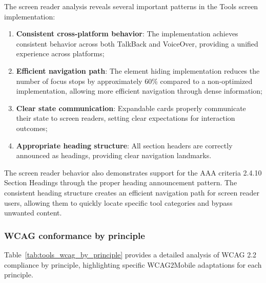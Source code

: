 The screen reader analysis reveals several important patterns in the Tools screen implementation:

\begin{enumerate}
    \item \textbf{Consistent cross-platform behavior}: The implementation achieves consistent behavior across both TalkBack and VoiceOver, providing a unified experience across platforms;
    
    \item \textbf{Efficient navigation path}: The element hiding implementation reduces the number of focus stops by approximately 60\% compared to a non-optimized implementation, allowing more efficient navigation through dense information;
    
    \item \textbf{Clear state communication}: Expandable cards properly communicate their state to screen readers, setting clear expectations for interaction outcomes;
    
    \item \textbf{Appropriate heading structure}: All section headers are correctly announced as headings, providing clear navigation landmarks.
\end{enumerate}

The screen reader behavior also demonstrates support for the AAA criteria 2.4.10 Section Headings through the proper heading announcement pattern. The consistent heading structure creates an efficient navigation path for screen reader users, allowing them to quickly locate specific tool categories and bypass unwanted content.

\subsubsection{WCAG conformance by principle}

Table~\ref{tab:tools_wcag_by_principle} provides a detailed analysis of WCAG 2.2 compliance by principle, highlighting specific WCAG2Mobile adaptations for each principle.

